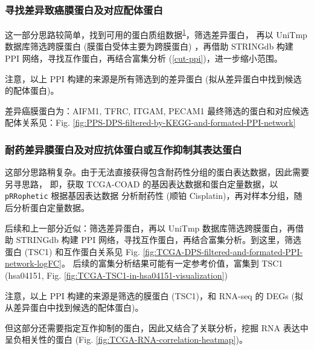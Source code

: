 \documentclass[
]{article}
\begin{document}
\hypertarget{ux5bfbux627eux5deeux5f02ux81f4ux764cux819cux86cbux767dux53caux5bf9ux5e94ux914dux4f53ux86cbux767d}{%
\subsubsection{寻找差异致癌膜蛋白及对应配体蛋白}\label{ux5bfbux627eux5deeux5f02ux81f4ux764cux819cux86cbux767dux53caux5bf9ux5e94ux914dux4f53ux86cbux767d}}

这一部分思路较简单，找到可用的蛋白质组数据\textsuperscript{\protect\hyperlink{ref-ProteomicsProfShao2022}{1}}，筛选差异蛋白，
再以 UniTmp 数据库筛选跨膜蛋白 (膜蛋白受体主要为跨膜蛋白) ，再借助 STRINGdb 构建
PPI 网络，寻找互作蛋白，再结合富集分析 (\ref{cut-ppi})，进一步缩小范围。

注意，以上 PPI 构建的来源是所有筛选到的差异蛋白 (拟从差异蛋白中找到候选的配体蛋白)。

差异癌膜蛋白为：AIFM1, TFRC, ITGAM, PECAM1
最终筛选的蛋白和对应候选配体关系见：Fig. \ref{fig:PPS-DPS-filtered-by-KEGG-and-formated-PPI-network}

\hypertarget{ux8010ux836fux5deeux5f02ux819cux86cbux767dux53caux5bf9ux5e94ux6297ux4f53ux86cbux767dux6216ux4e92ux4f5cux6291ux5236ux5176ux8868ux8fbeux86cbux767d}{%
\subsubsection{耐药差异膜蛋白及对应抗体蛋白或互作抑制其表达蛋白}\label{ux8010ux836fux5deeux5f02ux819cux86cbux767dux53caux5bf9ux5e94ux6297ux4f53ux86cbux767dux6216ux4e92ux4f5cux6291ux5236ux5176ux8868ux8fbeux86cbux767d}}

这部分思路稍复杂。由于无法直接获得包含耐药性分组的蛋白表达数据，因此需要另寻思路，
即，获取 TCGA-COAD 的基因表达数据和蛋白定量数据，以 \texttt{pRRophetic} 根据基因表达数据
分析耐药性 (顺铂 Cisplatin)，再对样本分组，随后分析蛋白定量数据。

后续和上一部分近似：筛选差异蛋白，再以 UniTmp 数据库筛选跨膜蛋白，再借助 STRINGdb 构建
PPI 网络，寻找互作蛋白，再结合富集分析。到这里，筛选蛋白 (TSC1) 和互作蛋白关系见
Fig. \ref{fig:TCGA-DPS-filtered-and-formated-PPI-network-logFC}。
后续的富集分析结果可能有一定参考价值，富集到 TSC1
(hsa04151, Fig. \ref{fig:TCGA-TSC1-in-hsa04151-visualization})

注意，以上 PPI 构建的来源是筛选的膜蛋白 (TSC1)，和 RNA-seq 的 DEGs (拟从差异蛋白中找到候选的配体蛋白)。

但这部分还需要指定互作抑制的蛋白，因此又结合了关联分析，挖掘 RNA 表达中呈负相关性的蛋白
(Fig. \ref{fig:TCGA-RNA-correlation-heatmap})。
\end{document}
